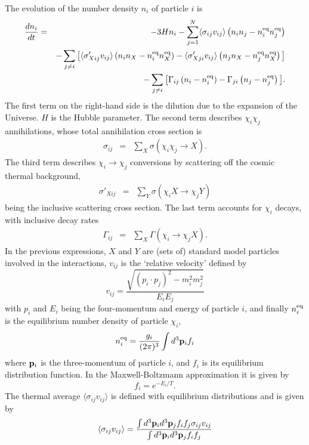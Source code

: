 The evolution of the number density $n_i$ of particle $i$ is
\begin{eqnarray} \label{eq:Boltzmann}
  \frac{dn_{i}}{dt} 
  &=& 
  -3 H n_{i} 
  - \sum_{j=1}^N \langle \sigma_{ij} v_{ij} \rangle 
    \left( n_{i} n_{j} - n_{i}^{\rm{eq}} n_{j}^{\rm{eq}} \right) 
  \nonumber \\ 
  & & 
  - \sum_{j\ne i} 
  \big[ \langle \sigma'_{Xij} v_{ij} \rangle 
        \left( n_i n_X - n_{i}^{\rm{eq}} n_{X}^{\rm{eq}} \right)
      - \langle \sigma'_{Xji} v_{ij} \rangle
        \left( n_j n_X - n_{j}^{\rm{eq}} n_{X}^{\rm{eq}} \right)
  \big]
  \nonumber \\ 
  & &
  - \sum_{j\ne i} 
  \big[ \Gamma_{ij} 
        \left( n_i - n_i^{\rm{eq}} \right) 
      - \Gamma_{ji} 
        \left( n_j - n_j^{\rm{eq}} \right) 
  \big] .
\end{eqnarray}
The first term on the right-hand side is the dilution due to the
expansion of the Universe. $H$ is the Hubble parameter. The second
term describes $\chi_i\chi_j$ annihilations, whose total
annihilation cross section is 
\begin{eqnarray}
  \sigma_{ij}  & = & \sum_X \sigma (\chi_i \chi_j \rightarrow X).
\end{eqnarray}
The third term describes $\chi_i \to \chi_j$ conversions by
scattering off the cosmic thermal background,
\begin{eqnarray}
  \sigma'_{Xij} & = & \sum_Y \sigma (\chi_i X \rightarrow \chi_j Y)
\end{eqnarray}
being the inclusive scattering cross section. The last term accounts
for $\chi_i$ decays, with inclusive decay rates 
\begin{eqnarray}
  \Gamma_{ij}  & = & \sum_X \Gamma (\chi_i \rightarrow \chi_j X).
\end{eqnarray}
In the previous expressions, $X$ and $Y$
are (sets of) standard model particles involved in the
interactions, $v_{ij}$ is the `relative velocity' defined by
\begin{equation}
  v_{ij} = \frac{\sqrt{(p_{i} \cdot p_{j})^2-m_{i}^2 m_{j}^2}}{E_{i} E_{j}}
\end{equation}
with $p_{i}$ and $E_{i}$ being the four-momentum and energy of 
particle $i$, and finally $n_{i}^{\rm{eq}}$ is the equilibrium number
density of particle $\chi_i$,
\begin{equation}
  n_{i}^{\rm{eq}} = \frac{g_{i}}{(2\pi)^3} \int d^3{\bf p}_{i}f_{i}
\end{equation}
where ${\bf p}_i$ is the three-momentum of particle $i$, and
 $f_i$ is its equilibrium distribution function. 
In the Maxwell-Boltzmann approximation it is given by
\begin{equation}
  f_{i} = e^{-E_{i}/T}.
\end{equation}
The thermal average $\langle\sigma_{ij}v_{ij}\rangle$ is defined
with equilibrium distributions and is given by
\begin{equation}
  \langle \sigma_{ij}v_{ij} \rangle = \frac{\int d^3{\bf
      p}_{i}d^3{\bf p}_{j} 
  f_{i}f_{j}\sigma_{ij}v_{ij}}
  {\int d^3{\bf p}_{i}d^3{\bf p}_{j}f_{i}f_{j}}
\end{equation}

